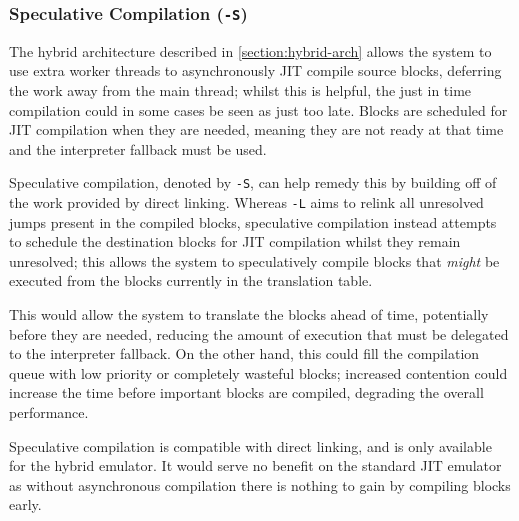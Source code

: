 \subsubsection{Speculative Compilation (\texttt{-S})}

The hybrid architecture described in \autoref{section:hybrid-arch} allows the system to use extra worker threads to asynchronously JIT compile source blocks, deferring the work away from the main thread; whilst this is helpful, the just in time compilation could in some cases be seen as just too late. Blocks are scheduled for JIT compilation when they are needed, meaning they are not ready at that time and the interpreter fallback must be used.

Speculative compilation, denoted by \texttt{-S}, can help remedy this by building off of the work provided by direct linking. Whereas \texttt{-L} aims to relink all unresolved jumps present in the compiled blocks, speculative compilation instead attempts to schedule the destination blocks for JIT compilation whilst they remain unresolved; this allows the system to speculatively compile blocks that \textit{might} be executed from the blocks currently in the translation table.

This would allow the system to translate the blocks ahead of time, potentially before they are needed, reducing the amount of execution that must be delegated to the interpreter fallback. On the other hand, this could fill the compilation queue with low priority or completely wasteful blocks; increased contention could increase the time before important blocks are compiled, degrading the overall performance.

Speculative compilation is compatible with direct linking, and is only available for the hybrid emulator. It would serve no benefit on the standard JIT emulator as without asynchronous compilation there is nothing to gain by compiling blocks early.